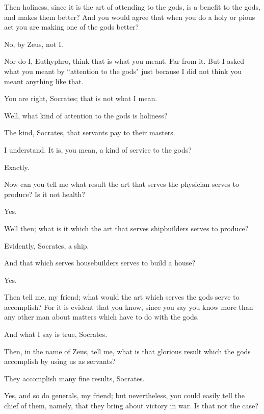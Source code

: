 \documentclass[letterpaper,12pt]{article}
\newcommand{\stephpag}[1]{\marginnote{\small\itshape\fontfamily{ppl}\selectfont #1}}
\begin{document}
\begin{drama}
\socratesspeaks
Then holiness, since it is the art of attending to the gods, is a benefit to the gods, and makes them better? And you would agree that when you do a holy or pious act you are making one of the gods better?

\euthyphrospeaks
No, by Zeus, not I.

\socratesspeaks
Nor do I, Euthyphro, think that is what you meant. Far from it. But I asked what you meant by \stephpag{d} ``attention to the gods" just because I did not think you meant anything like that.

\euthyphrospeaks
You are right, Socrates; that is not what I mean.

\socratesspeaks
Well, what kind of attention to the gods is holiness?

\euthyphrospeaks
The kind, Socrates, that servants pay to their masters.

\socratesspeaks
I understand. It is, you mean, a kind of service to the gods?

\euthyphrospeaks
Exactly.

\socratesspeaks
Now can you tell me what result the art that serves the physician serves to produce? Is it not health?

\euthyphrospeaks
Yes.

\socratesspeaks
Well then; what is it which the art \stephpag{e} that serves shipbuilders serves to produce?

\euthyphrospeaks
Evidently, Socrates, a ship.

\socratesspeaks
And that which serves housebuilders serves to build a house?

\euthyphrospeaks
Yes.

\socratesspeaks
Then tell me, my friend; what would the art which serves the gods serve to accomplish? For it is evident that you know, since you say you know more than any other man about matters which have to do with the gods.

\euthyphrospeaks
And what I say is true, Socrates.

\socratesspeaks
Then, in the name of Zeus, tell me, what is that glorious result which the gods accomplish by using us as servants?

\euthyphrospeaks
They accomplish many fine results, Socrates. \stephpag{14 a}

\socratesspeaks
Yes, and so do generals, my friend; but nevertheless, you could easily tell the chief of them, namely, that they bring about victory in war. Is that not the case?


\end{drama}
\end{document}
